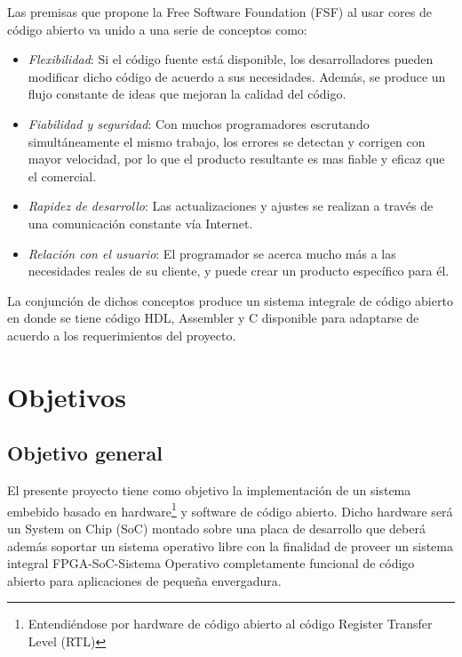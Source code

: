 Las premisas que propone la Free Software Foundation (FSF) al usar cores de código abierto va unido a una serie de conceptos como:
\begin{itemize}
\item \textit{Flexibilidad}: Si el código fuente está disponible, los
  desarrolladores pueden modificar dicho código de acuerdo a sus
  necesidades. Además, se produce un flujo constante de ideas que
  mejoran la calidad del código.
\item \textit{Fiabilidad y seguridad}: Con muchos programadores
  escrutando simultáneamente el mismo trabajo, los errores se detectan
  y corrigen con mayor velocidad, por lo que el producto resultante es
  mas fiable y eficaz que el comercial.
\item \textit{Rapidez de desarrollo}: Las actualizaciones y ajustes se
  realizan a través de una comunicación constante vía Internet.
\item \textit{Relación con el usuario}: El programador se acerca mucho
  más a las necesidades reales de su cliente, y puede crear un
  producto específico para él.
\end{itemize}

La conjunción de dichos conceptos produce un sistema integrale de
código abierto en donde se tiene código HDL, Assembler y C disponible
para adaptarse de acuerdo a los requerimientos del proyecto.


\section{Objetivos}
\subsection{Objetivo general}
El presente proyecto tiene como objetivo la implementación de un sistema embebido basado en hardware\footnote{Entendiéndose por hardware de código abierto al código Register Transfer Level (RTL)} y software de código abierto.
Dicho hardware será un System on Chip (SoC) montado sobre una placa de desarrollo que deberá además soportar un sistema operativo
libre con la finalidad de proveer un sistema integral FPGA-SoC-Sistema
Operativo completamente funcional de código abierto para aplicaciones de pequeña envergadura.

